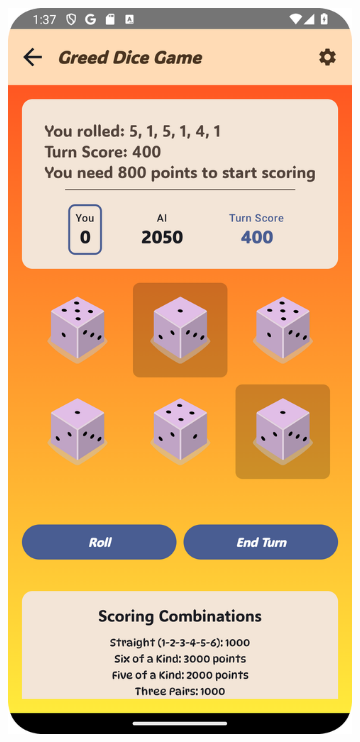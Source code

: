 \begin{figure}[h]
    \hfill
    \begin{subfigure}[b]{0.27\textwidth}
        \includegraphics[width=\textwidth]{img/greed board.png}

\end{subfigure}
\end{figure}
